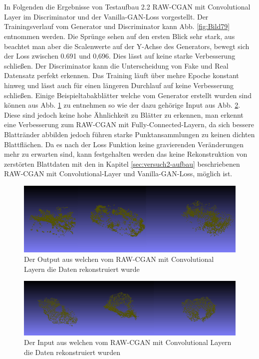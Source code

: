 \documentclass{llncs}
\begin{document}
\newpage
~\\\\
In Folgenden die Ergebnisse von Testaufbau 2.2 RAW-CGAN mit Convolutional Layer im Discriminator und der Vanilla-GAN-Loss vorgestellt. Der Trainingsverlauf vom Generator und Discriminator kann Abb. \ref{fig:Bild79} entnommen werden. Die Sprünge sehen auf den ersten Blick sehr stark, aus beachtet man aber die Scalenwerte auf der Y-Achse des Generators, bewegt sich der Loss zwischen 0.691 und 0,696. Dies lässt auf keine starke Verbesserung schließen. Der Discriminator kann die Unterscheidung von Fake und Real Datensatz perfekt erkennen. Das Training läuft über mehre Epoche konstant hinweg und lässt auch für einen längeren Durchlauf auf keine Verbesserung schließen. Einige Beispieltabakblätter welche vom Generator erstellt wurden sind können aus Abb. \ref{fig:Bild80} zu entnehmen so wie der dazu gehörige Input aus Abb. \ref{fig:Bild78}. Diese sind jedoch keine hohe Ähnlichkeit zu Blätter zu erkennen, man erkennt eine Verbesserung zum RAW-CGAN mit Fully-Connected-Layern, da sich bessere Blattränder abbilden jedoch führen starke Punktansammlungen zu keinen dichten Blattflächen. Da es nach der Loss Funktion keine gravierenden Veränderungen mehr zu erwarten sind, kann festgehalten werden das keine Rekonstruktion von zerstörten Blattdaten mit den in Kapitel \ref{sec:versuch2-aufbau} beschriebenen RAW-CGAN mit Convolutional-Layer und Vanilla-GAN-Loss, möglich ist.
\begin{figure}[htbp] 
	\centering
	\includegraphics[width=1.0\textwidth]{dcpgan_ws_fake.png}
	\caption{Der Output aus welchen vom RAW-CGAN mit Convolutional Layern die Daten rekonstruiert wurde}
	\label{fig:Bild80}
\end{figure}
\begin{figure}[htbp] 
	\centering
	\includegraphics[width=1.0\textwidth]{dc_pgan_ws_real.png}
	\caption{Der Input aus welchen vom RAW-CGAN mit Convolutional Layern die Daten rekonstruiert wurden}
	\label{fig:Bild78}
\end{figure}
\end{document}

